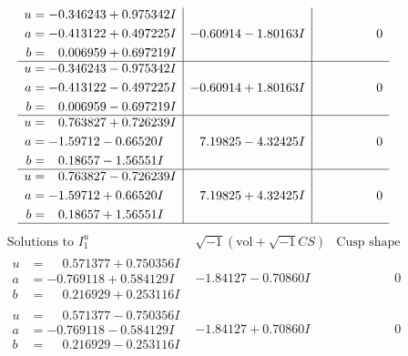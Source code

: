 \documentclass[1p]{elsarticle_modified}
\theoremstyle{definition}
\newcommand{\I}{\sqrt{-1}}
\begin{document}
$$\begin{array}{c|c|c}
\begin{aligned}
u &= -0.346243 + 0.975342 I \\
a &= -0.413122 + 0.497225 I \\
b &= \phantom{-}0.006959 + 0.697219 I\end{aligned}
 & -0.60914 - 1.80163 I & \phantom{-0.000000 } 0 \\ \hline\begin{aligned}
u &= -0.346243 - 0.975342 I \\
a &= -0.413122 - 0.497225 I \\
b &= \phantom{-}0.006959 - 0.697219 I\end{aligned}
 & -0.60914 + 1.80163 I & \phantom{-0.000000 } 0 \\ \hline\begin{aligned}
u &= \phantom{-}0.763827 + 0.726239 I \\
a &= -1.59712 - 0.66520 I \\
b &= \phantom{-}0.18657 - 1.56551 I\end{aligned}
 & \phantom{-}7.19825 - 4.32425 I & \phantom{-0.000000 } 0 \\ \hline\begin{aligned}
u &= \phantom{-}0.763827 - 0.726239 I \\
a &= -1.59712 + 0.66520 I \\
b &= \phantom{-}0.18657 + 1.56551 I\end{aligned}
 & \phantom{-}7.19825 + 4.32425 I & \phantom{-0.000000 } 0\\
 \hline 
 \end{array}$$\newpage$$\begin{array}{c|c|c}  
\text{Solutions to }I^u_{1}& \I (\text{vol} + \sqrt{-1}CS) & \text{Cusp shape}\\
 \hline 
\begin{aligned}
u &= \phantom{-}0.571377 + 0.750356 I \\
a &= -0.769118 + 0.584129 I \\
b &= \phantom{-}0.216929 + 0.253116 I\end{aligned}
 & -1.84127 - 0.70860 I & \phantom{-0.000000 } 0 \\ \hline\begin{aligned}
u &= \phantom{-}0.571377 - 0.750356 I \\
a &= -0.769118 - 0.584129 I \\
b &= \phantom{-}0.216929 - 0.253116 I\end{aligned}
 & -1.84127 + 0.70860 I & \phantom{-0.000000 } 0 \\ \hline\begin{aligned}

\end{aligned}
\end{array}$$
\end{document}
